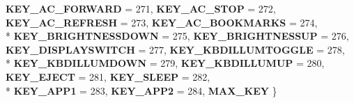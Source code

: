 \begin{DoxyCompactItemize}
{\bfseries K\+E\+Y\+\_\+\+A\+C\+\_\+\+F\+O\+R\+W\+A\+R\+D} = 271, 
{\bfseries K\+E\+Y\+\_\+\+A\+C\+\_\+\+S\+T\+O\+P} = 272, 
{\bfseries K\+E\+Y\+\_\+\+A\+C\+\_\+\+R\+E\+F\+R\+E\+S\+H} = 273, 
{\bfseries K\+E\+Y\+\_\+\+A\+C\+\_\+\+B\+O\+O\+K\+M\+A\+R\+K\+S} = 274, 
\\*
{\bfseries K\+E\+Y\+\_\+\+B\+R\+I\+G\+H\+T\+N\+E\+S\+S\+D\+O\+W\+N} = 275, 
{\bfseries K\+E\+Y\+\_\+\+B\+R\+I\+G\+H\+T\+N\+E\+S\+S\+U\+P} = 276, 
{\bfseries K\+E\+Y\+\_\+\+D\+I\+S\+P\+L\+A\+Y\+S\+W\+I\+T\+C\+H} = 277, 
{\bfseries K\+E\+Y\+\_\+\+K\+B\+D\+I\+L\+L\+U\+M\+T\+O\+G\+G\+L\+E} = 278, 
\\*
{\bfseries K\+E\+Y\+\_\+\+K\+B\+D\+I\+L\+L\+U\+M\+D\+O\+W\+N} = 279, 
{\bfseries K\+E\+Y\+\_\+\+K\+B\+D\+I\+L\+L\+U\+M\+U\+P} = 280, 
{\bfseries K\+E\+Y\+\_\+\+E\+J\+E\+C\+T} = 281, 
{\bfseries K\+E\+Y\+\_\+\+S\+L\+E\+E\+P} = 282, 
\\*
{\bfseries K\+E\+Y\+\_\+\+A\+P\+P1} = 283, 
{\bfseries K\+E\+Y\+\_\+\+A\+P\+P2} = 284, 
{\bfseries M\+A\+X\+\_\+\+K\+E\+Y}
 \}\label{class_z_e_g_l_1_1_input_a63c4a9987b2fe681fcf8e17d5f88a838}

\end{DoxyCompactItemize}
